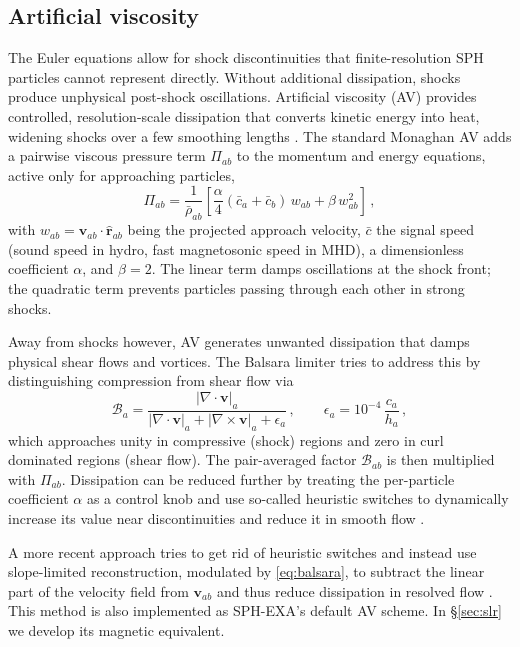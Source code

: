 \subsection{Artificial viscosity}
\label{sec:av}

The Euler equations allow for shock discontinuities that finite-resolution SPH particles cannot represent directly. Without additional dissipation, shocks produce unphysical post-shock oscillations. Artificial viscosity (AV) provides controlled, resolution-scale dissipation that converts kinetic energy into heat, widening shocks over a few smoothing lengths \cite{Rosswog2009}. The standard Monaghan AV adds a pairwise viscous pressure term $\Pi_{ab}$ to the momentum and energy equations, active only for approaching particles, %
\begin{equation}
    \Pi_{ab} = \frac{1}{\bar{\rho}_{ab}} \left[\frac{\alpha}{4}(\bar{c}_a + \bar{c}_b)\, w_{ab} + \beta \, w_{ab}^2 \right]\,,
    \label{eq:av_Pi}
\end{equation}
with $w_{ab} = \mathbf{v}_{ab} \cdot \hat{\mathbf{r}}_{ab}$ being the projected approach velocity, $\bar{c}$ the signal speed (sound speed in hydro, fast magnetosonic speed in MHD), a dimensionless coefficient $\alpha$, and $\beta = 2$. The linear term damps oscillations at the shock front; the quadratic term prevents particles passing through each other in strong shocks. 

Away from shocks however, AV generates unwanted dissipation that damps physical shear flows and vortices. The Balsara limiter \cite{Balsara1995} tries to address this by distinguishing compression from shear flow via
\begin{equation}
    \mathcal{B}_a = \frac{|\nabla \cdot \mathbf{v}|_a}{|\nabla \cdot \mathbf{v}|_a + |\nabla \times \mathbf{v}|_a + \epsilon_a}\,, \qquad \epsilon_a = 10^{-4}\,\frac{c_a}{h_a}\,,
    \label{eq:balsara}
\end{equation}
which approaches unity in compressive (shock) regions and zero in curl dominated regions (shear flow). The pair-averaged factor $\mathcal{B}_{ab}$ is then multiplied with $\Pi_{ab}$. Dissipation can be reduced further by treating the per-particle coefficient $\alpha$ as a control knob and use so-called heuristic switches to dynamically increase its value near discontinuities and reduce it in smooth flow \cite{MorrisMonaghan1997}. 

A more recent approach tries to get rid of heuristic switches and instead use slope-limited reconstruction, modulated by \eqref{eq:balsara}, to subtract the linear part of the velocity field from $\mathbf{v}_{ab}$ and thus reduce dissipation in resolved flow \cite{GarciaSenzCabezon2026}. This method is also implemented as SPH-EXA's default AV scheme. In §\ref{sec:slr} we develop its magnetic equivalent.  

